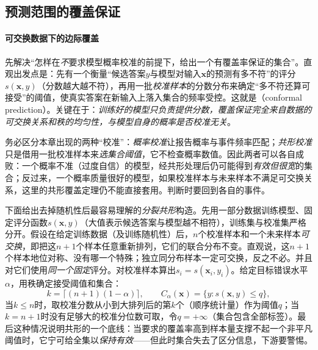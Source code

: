 \subsection{预测范围的覆盖保证}

\paragraph{可交换数据下的边际覆盖}

先解决“怎样在\emph{不}要求模型概率校准的前提下，给出一个有覆盖率保证的集合”。直观出发点是：先有一个衡量“候选答案$y$与模型对输入$\bm{x}$的预测有多不符”的评分$s(\bm{x},y)$（分数越大越不符），再用一批\emph{校准样本}的分数分布来确定“多不符还算可接受”的阈值，使真实答案在新输入上落入集合的频率受控。这就是（conformal prediction）。关键在于：\emph{训练好的模型只负责提供分数，覆盖保证完全来自数据的可交换关系和秩的均匀性，与模型自身的概率是否校准无关}。

务必区分本章出现的两种“校准”：\emph{概率校准}让报告概率与事件频率匹配；\emph{共形校准}只是借用一批校准样本来\emph{选集合阈值}，它不检查概率数值。因此两者可以各自成败：一个概率不准（过度自信）的模型，经共形处理后仍可能得到\emph{有效但很宽}的集合；反过来，一个概率质量很好的模型，如果校准样本与未来样本不满足可交换关系，这里的共形覆盖定理仍不能直接套用。判断时要回到各自的事件。

下面给出去掉随机性后最容易理解的\emph{分裂共形}构造。先用一部分数据训练模型、固定评分函数$s(\bm{x},y)$（大值表示候选答案与模型越不相符），训练集与校准集严格分开。假设在给定训练数据（及训练随机性）后，$n$个校准样本和一个未来样本\emph{可交换}，即把这$n+1$个样本任意重新排列，它们的联合分布不变。直观说，这$n+1$个样本地位对称、没有哪一个特殊；独立同分布样本一定可交换，反之不必。并且对它们使用\emph{同一个固定}评分。对校准样本算出$s_i=s(\bm{x}_i,y_i)$。给定目标错误水平$\alpha$，用秩确定接受阈值和集合：
\begin{equation}
 k=\lceil(n+1)(1-\alpha)\rceil,\qquad
 C_\alpha(\bm{x})=\{y:s(\bm{x},y)\leq q\},
 \label{eq:reliability-conformal-set}
\end{equation}
当$k\leq n$时，取校准分数从小到大排列后的第$k$个（顺序统计量）作为阈值$q$；当$k=n+1$时没有足够大的校准分位数可取，令$q=+\infty$（集合包含全部标签）。最后这种情况说明共形的一个底线：当要求的覆盖率高到样本量支撑不起一个非平凡阈值时，它宁可给全集以\emph{保持有效}——但此时集合失去了区分信息，下游要警惕。

